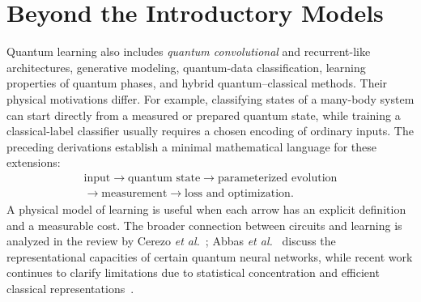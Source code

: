 \section{Beyond the Introductory Models}
Quantum learning also includes \emph{quantum convolutional} and recurrent-like architectures, generative modeling, quantum-data classification, learning properties of quantum phases, and hybrid quantum--classical methods. Their physical motivations differ. For example, classifying states of a many-body system can start directly from a measured or prepared quantum state, while training a classical-label classifier usually requires a chosen encoding of ordinary inputs. The preceding derivations establish a minimal mathematical language for these extensions:
\begin{equation}
\begin{gathered}
\text{input}\longrightarrow\text{quantum state}
\longrightarrow\text{parameterized evolution}\\[2pt]
\longrightarrow\text{measurement}
\longrightarrow\text{loss and optimization}.
\end{gathered}
\end{equation}
A physical model of learning is useful when each arrow has an explicit definition and a measurable cost. The broader connection between circuits and learning is analyzed in the review by Cerezo \emph{et al.}~\cite{Cerezo2021}; Abbas \emph{et al.}~\cite{Abbas2021} discuss the representational capacities of certain quantum neural networks, while recent work continues to clarify limitations due to statistical concentration and efficient classical representations~\cite{Larocca2025}.